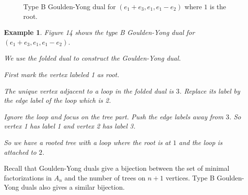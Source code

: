 \documentclass[11pt]{amsart}
\newtheorem{exa}[thm]{Example}%
\begin{document}
\begin{figure}
    \centering
    \caption{Type B Goulden-Yong dual for $(e_1+e_3,e_1,e_1-e_2)$ where $1$ is the root.}
\end{figure}

\begin{exa}
    Figure 14 shows the type B Goulden-Yong dual for $(e_1+e_3,e_1,e_1-e_2)$.
    
    We use the folded dual to construct the Goulden-Yong dual.
    
    First mark the vertex labeled 1 as root.
    
    The unique vertex adjacent to a loop in the folded dual is $3$. Replace its label by the edge label of the loop which is 2.

    Ignore the loop and focus on the tree part. Push the edge labels away from $3$. So vertex 1 has label 1 and vertex 2 has label 3.

    So we have a rooted tree with a loop where the root is at $1$ and the loop is attached to $2$.
\end{exa}

Recall that Goulden-Yong duals give a bijection between the set of minimal factorizations in $A_n$ and the number of trees on $n+1$ vertices. Type B Goulden-Yong duals also gives a similar bijection. 
\end{document}
